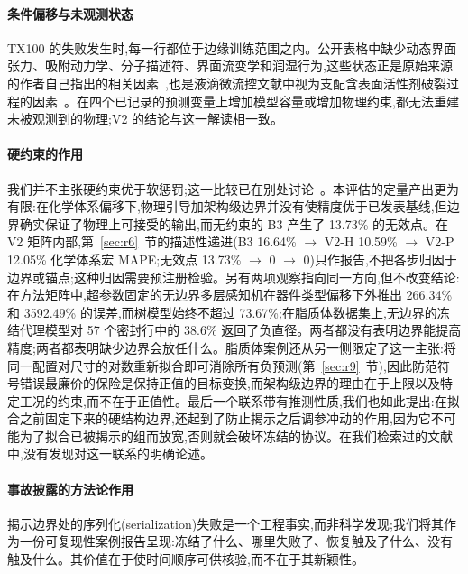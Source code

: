 \documentclass[11pt,a4paper]{ctexart}
\begin{document}
\paragraph{条件偏移与未观测状态} TX100 的失败发生时,每一行都位于边缘训练范围之内。公开表格中缺少动态界面张力、吸附动力学、分子描述符、界面流变学和润湿行为,这些状态正是原始来源的作者自己指出的相关因素~\cite{chagot2022},也是液滴微流控文献中视为支配含表面活性剂破裂过程的因素~\cite{anna2016}。在四个已记录的预测变量上增加模型容量或增加物理约束,都无法重建未被观测到的物理;V2 的结论与这一解读相一致。

\paragraph{硬约束的作用} 我们并不主张硬约束优于软惩罚;这一比较已在别处讨论~\cite{naturecs2021,baty2023,prnet2026}。本评估的定量产出更为有限:在化学体系偏移下,物理引导加架构级边界并没有使精度优于已发表基线,但边界确实保证了物理上可接受的输出,而无约束的 B3 产生了 13.73\% 的无效点。在 V2 矩阵内部,第~\ref{sec:r6}~节的描述性递进(B3 16.64\% $\to$ V2-H 10.59\% $\to$ V2-P 12.05\% 化学体系宏 MAPE;无效点 13.73\% $\to$ 0 $\to$ 0)只作报告,不把各步归因于边界或锚点;这种归因需要预注册检验。另有两项观察指向同一方向,但不改变结论:在方法矩阵中,超参数固定的无边界多层感知机在器件类型偏移下外推出 266.34\% 和 3592.49\% 的误差,而树模型始终不超过 73.67\%;在脂质体数据集上,无边界的冻结代理模型对 57 个密封行中的 38.6\% 返回了负直径。两者都没有表明边界能提高精度;两者都表明缺少边界会放任什么。脂质体案例还从另一侧限定了这一主张:将同一配置对尺寸的对数重新拟合即可消除所有负预测(第~\ref{sec:r9}~节),因此防范符号错误最廉价的保险是保持正值的目标变换,而架构级边界的理由在于上限以及特定工况的约束,而不在于正值性。最后一个联系带有推测性质,我们也如此提出:在拟合之前固定下来的硬结构边界,还起到了防止揭示之后调参冲动的作用,因为它不可能为了拟合已被揭示的组而放宽,否则就会破坏冻结的协议。在我们检索过的文献中,没有发现对这一联系的明确论述。

\paragraph{事故披露的方法论作用} 揭示边界处的序列化(serialization)失败是一个工程事实,而非科学发现;我们将其作为一份可复现性案例报告呈现:冻结了什么、哪里失败了、恢复触及了什么、没有触及什么。其价值在于使时间顺序可供核验,而不在于其新颖性。
\end{document}
